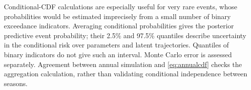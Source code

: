 \documentclass[11pt,a4paper]{article}
\begin{document}
	Conditional-CDF calculations are especially useful for very rare
	events, whose probabilities would be estimated imprecisely from a
	small number of binary exceedance indicators. Averaging conditional
	probabilities gives the posterior predictive event probability;
	their 2.5\% and 97.5\% quantiles describe uncertainty in the
	conditional risk over parameters and latent trajectories. Quantiles
	of binary indicators do not give such an interval. Monte Carlo
	error is assessed separately. Agreement between annual simulation
	and \cref{eq:annualcdf} checks the aggregation calculation, rather
	than validating conditional independence between seasons.
	
	
	
\end{document}
